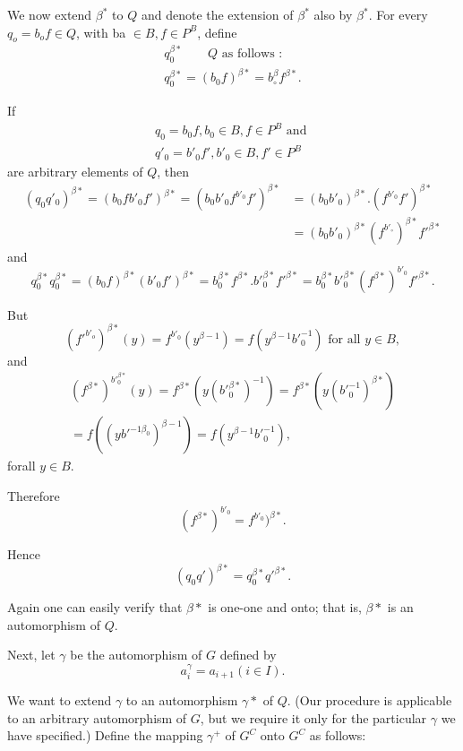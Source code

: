 We now extend ${\beta^*}$ to $Q$ and denote the extension of ${\beta^*}$
also by ${\beta^*}$. For every $q_o = b_o f \in  Q$, with ba
$\in  B, f \in  P^B$, define\pageoriginale  
\begin{gather*}
  q^{\beta*}_0 \qquad Q \text{ as follows }:\\
  q^{\beta*}_0 = (b_0 f)^{\beta*} = b^{\beta}_\circ f^{\beta*}.
\end{gather*} 

 If
\begin{gather*}
  q_0 = b_0 f, b_0 \in  B, f \in  P^B \text{ and }\\
  q'_0 = b'_0 f', b'_0 \in  B, f' \in  P^B
\end{gather*}
are arbitrary elements of $Q$, then 
\begin{align*}
  (q_0q'_0)^{\beta*} = (b_0 fb'_0 f')^{\beta*} = (b_0 b'_0
  f^{b'_0}f')^{\beta*}& = (b_0 b'_0)^{\beta*}
 .  (f^{b'_0}f')^{\beta*}\\ 
  & = (b_0 b'_0)^{\beta*} (f^{b'_\circ})^{\beta*} f'^{{\beta*}}
\end{align*}
and 
$$
q^{\beta*}_0 q^{\beta*}_0 = (b_0 f)^{\beta*} (b'_0 f ')^{\beta*} =
b^{\beta*}_0 f^{\beta*}. b'^{\beta*}_0 f'^{\beta*} = b^{\beta*}_0
b'^{\beta*}_0 (f^{\beta*})^{b'_0}f'^{\beta*}. 
$$

But 
$$
  (f'^{b'_o})^{\beta*} (y) = f^{b'_0}(y^{\beta-1}) = f(y^{\beta-1}
  b'^{-1}_0) \text{ for all } y \in  B,
$$
and
\begin{multline*}
  (f^{\beta*})^{b'^{\beta*}_0}(y) = f^{\beta*} (y(b'^{{\beta*}}_0)^{-1})
  = f^{\beta*} (y(b'^{-1}_0)^{\beta*})\\ 
  = f((yb'^{-1
    {\beta}_0})^{\beta-1}) = f(y^{\beta-1}b'^{-1}_0),
\end{multline*}
for\pageoriginale all $y \in  B$.

Therefore
$$
(f^{\beta*})^{b'_0} = f^{b'_0})^{\beta*}.
$$

Hence 
$$
(q_0 q')^{\beta*} = q^{\beta*}_0 q'^{\beta*}.
$$

Again one can easily verify that ${\beta*}$ is one-one and onto; that
is, ${\beta*}$ is an automorphism of $Q$. 

Next, let $\gamma$ be the automorphism of $G$ defined by 
$$
a^{\gamma}_i = a_{i + 1} (i \in  I).
$$

We want to extend $\gamma$ to an automorphism $\gamma*$ of $Q$. (Our
procedure is applicable to an arbitrary automorphism of $G$, but we
require it only for the particular $\gamma$ we have specified.) Define
the mapping $\gamma^+$ of $G^C$ onto $G^C$ as follows: 

